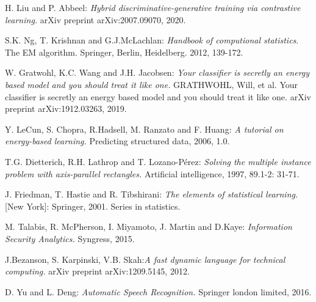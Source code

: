 \begin{thebibliography}{1}
 H. Liu and P. Abbeel: \emph{Hybrid discriminative-generative training via contrastive learning.} arXiv preprint arXiv:2007.09070, 2020.

 S.K. Ng, T. Krishnan and G.J.McLachlan: \emph{Handbook of computional statistics}. The EM algorithm. Springer, Berlin, Heidelberg. 2012, 139-172.

 W. Gratwohl, K.C. Wang and J.H. Jacobsen: \emph{Your classifier is secretly an energy based model and you should treat it like one.} GRATHWOHL, Will, et al. Your classifier is secretly an energy based model and you should treat it like one. arXiv preprint arXiv:1912.03263, 2019.

 Y. LeCun, S. Chopra, R.Hadsell, M. Ranzato and F. Huang: \emph{A tutorial on energy-based learning.}  Predicting structured data, 2006, 1.0.

 T.G. Dietterich, R.H. Lathrop and T. Lozano-Pérez: \emph{Solving the multiple instance problem with axis-parallel rectangles.}  Artificial intelligence, 1997, 89.1-2: 31-71.

 J. Friedman, T. Hastie and R. Tibshirani: \emph{The elements of statistical learning.} [New York]: Springer, 2001. Series in statistics.

 M. Talabis, R. McPherson, I. Miyamoto, J. Martin and D.Kaye: \emph{Information Security Analytics.} Syngress, 2015.

 J.Bezanson, S. Karpinski, V.B. Skah:\emph{A fast dynamic language for technical computing.} arXiv preprint arXiv:1209.5145, 2012.

 D. Yu and L. Deng: \emph{Automatic Speech Recognition.} Springer london limited, 2016.
\end{thebibliography}
